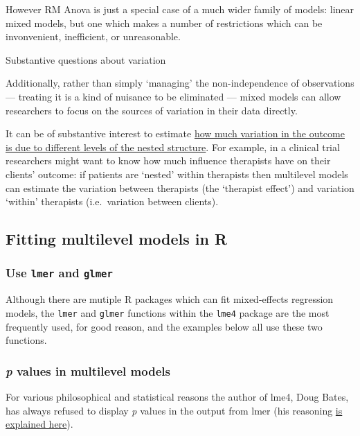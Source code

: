 \documentclass[]{article}
\theoremstyle{definition}
\theoremstyle{definition}
\theoremstyle{definition}
\theoremstyle{remark}
\begin{document}
However RM Anova is just a special case of a much wider family of
models: linear mixed models, but one which makes a number of
restrictions which can be invonvenient, inefficient, or unreasonable.

Substantive questions about variation

Additionally, rather than simply `managing' the non-independence of
observations --- treating it is a kind of nuisance to be eliminated ---
mixed models can allow researchers to focus on the sources of variation
in their data directly.

It can be of substantive interest to estimate
\protect\hyperlink{icc-and-vpc}{how much variation in the outcome is due
to different levels of the nested structure}. For example, in a clinical
trial researchers might want to know how much influence therapists have
on their clients' outcome: if patients are `nested' within therapists
then multilevel models can estimate the variation between therapists
(the `therapist effect') and variation `within' therapists
(i.e.~variation between clients).

\subsection*{Fitting multilevel models in R}\label{fitting-models}

\subsubsection*{\texorpdfstring{Use \texttt{lmer} and
\texttt{glmer}}{Use lmer and glmer}}\label{use-lmer-and-glmer}

Although there are mutiple R packages which can fit mixed-effects
regression models, the \texttt{lmer} and \texttt{glmer} functions within
the \texttt{lme4} package are the most frequently used, for good reason,
and the examples below all use these two functions.

\subsubsection*{\texorpdfstring{\emph{p} values in multilevel
models}{p values in multilevel models}}\label{p-values-in-multilevel-models}

For various philosophical and statistical reasons the author of lme4,
Doug Bates, has always refused to display \emph{p} values in the output
from lmer (his reasoning
\href{https://stat.ethz.ch/pipermail/r-help/2006-May/094765.html}{is
explained here}).
\end{document}

